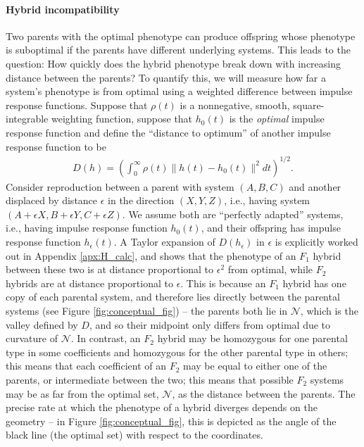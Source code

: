 \documentclass{article}
\newcommand{\1}{\mathbbm{1}}
\newcommand{\allS}{\mathcal{N}}
\begin{document}
\paragraph{Hybrid incompatibility}
Two parents with the optimal phenotype can produce offspring whose phenotype is suboptimal
if the parents have different underlying systems.
This leads to the question: 
How quickly does the hybrid phenotype break down with increasing distance between the parents?
To quantify this, we will measure how far a system's phenotype is from optimal
using a weighted difference between impulse response functions.
Suppose that $\rho(t)$ is a nonnegative, smooth, square-integrable weighting function,
suppose that $h_0(t)$ is the \emph{optimal} impulse response function 
and define the ``distance to optimum'' of another impulse response function
to be
\begin{align}
	D(h) = \left( \int_0^\infty \rho(t) \|h(t) - h_0(t)\|^2 dt \right)^{1/2} .
\end{align}
Consider reproduction between a parent with system $(A, B, C)$ 
and another displaced by distance $\epsilon$ in the direction $(X,Y,Z)$,
i.e., having  system $(A + \epsilon X, B + \epsilon Y, C + \epsilon Z)$.
We assume both are ``perfectly adapted'' systems, 
i.e., having impulse response function $h_0(t)$,
and their offspring has impulse response function $h_\epsilon(t)$.
A Taylor expansion of $D(h_\epsilon)$ in $\epsilon$ is explicitly worked out in Appendix \ref{apx:H_calc},
and shows that the phenotype of an $F_1$ hybrid between these two is at distance proportional to $\epsilon^2$ from optimal,
while $F_2$ hybrids are at distance proportional to $\epsilon$.
This is because an $F_1$ hybrid has one copy of each parental system,
and therefore lies directly between the parental systems (see Figure \ref{fig:conceptual_fig}) --
the parents both lie in $\allS$, which is the valley defined by $D$,
and so their midpoint only differs from optimal due to curvature of $\allS$.
In contrast, an $F_2$ hybrid may be homozygous for one parental type in some coefficients
and homozygous for the other parental type in others;
this means that each coefficient of an $F_2$ may be equal to either one of the parents,
or intermediate between the two;
this means that possible $F_2$ systems may be as far from the optimal set, $\allS$,
as the distance between the parents.
The precise rate at which the phenotype of a hybrid diverges depends on the geometry --
in Figure \ref{fig:conceptual_fig}, this is depicted as the angle of the black line (the optimal set)
with respect to the coordinates.
\end{document}
